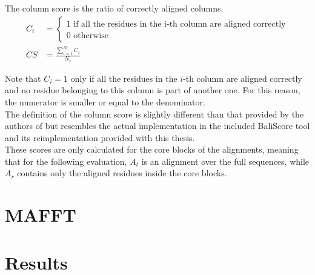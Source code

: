 \begin{mydef}
	The column score is the ratio of correctly aligned columns. 
	\begin{align*}
	C_i &= \begin{cases}
	1 \text{ if all the residues in the i-th column are aligned correctly}\\
	0 \text{ otherwise}
	\end{cases} \\
	CS &= \frac{\sum_{i=1}^{N_t} C_i}{N_r}
	\end{align*}
\end{mydef}
Note that $C_i = 1$ only if all the residues in the $i$-th column are aligned correctly and no residue belonging to this column is part of another one. For this reason, the numerator is smaller or equal to the denominator.\\
The definition of the column score is slightly different than that provided by the authors of \bb \cite{thompson1999comprehensive} but resembles the actual implementation in the included BaliScore tool and its reimplementation provided with this thesis.\\
These scores are only calculated for the core blocks of the \bb alignments, meaning that for the following evaluation, $A_t$ is an alignment over the full sequences, while $A_r$ contains only the aligned residues inside the core blocks.

\section{MAFFT}

\section{Results}
